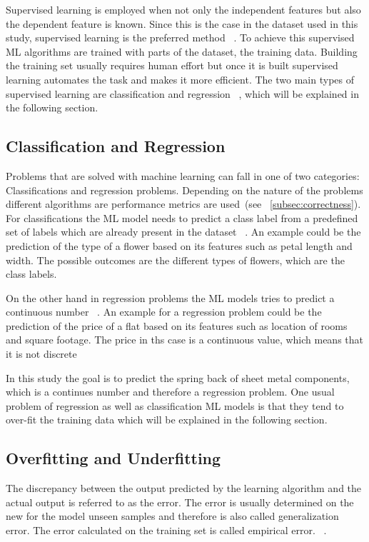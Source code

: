 Supervised learning is employed when not only the independent features but also the dependent feature is known.
Since this is the case in the dataset used in this study, supervised learning is the preferred
method
~\cite[p. 2]{muller_introductionmachinelearning_2016}.
To achieve this supervised \ac{ML} algorithms are trained with parts of the dataset, the training data.
Building the training set usually requires human effort but once it is built supervised learning automates the task
and makes it more efficient.
The two main types of supervised learning are classification and regression
~\cite[p. 25]{muller_introductionmachinelearning_2016}, which will be explained in the following section.

\subsection{Classification and Regression}\label{subsec:regression}
Problems that are solved with machine learning can fall in one of two categories: Classifications and regression
problems.
Depending on the nature of the problems different algorithms are performance metrics are used~(see
~\cref{subsec:correctness}).
For classifications the ML model needs to predict a class label from a predefined set of labels which are already
present in the dataset
~\cite[pp. 25--26]{muller_introductionmachinelearning_2016}.
An example could be the prediction of the type of a flower based on its features such as
petal length and width.
The possible outcomes are the different types of flowers, which are the class labels.

On the other hand in regression problems the ML models tries to predict a continuous number
~\cite[pp. 25--26]{muller_introductionmachinelearning_2016}.
An example for a regression problem could be the prediction of the price of a flat based on its features such as
location of rooms and square footage.
The price in ths case is a continuous value, which means that it is not discrete

In this study the goal is to predict the spring back of sheet metal components, which is a continues number and
therefore a regression problem.
One usual problem of regression as well as classification ML models is that they tend to over-fit the training data
which will be explained in the following section.

\subsection{Overfitting and Underfitting}\label{subsec:overfitting-and-underfitting}
The discrepancy between the output predicted by the learning algorithm and the actual output is referred to as the
error.
The error is usually determined on the new for the model unseen samples and therefore is also
called generalization error.
The error calculated on the training set is called empirical error.
~\cite[p. 26]{zhou_machinelearning_2021}.


